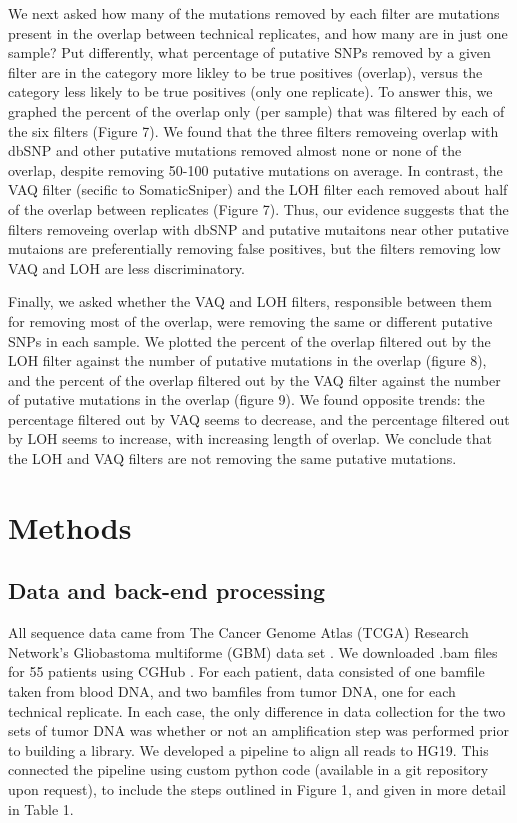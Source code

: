 \documentclass[11pt]{article} %
\begin{document}
We next asked how many of the mutations removed by each filter are mutations present in the overlap between technical replicates, and how many are in just one sample? Put differently, what percentage of putative SNPs removed by a given filter are in the category more likley to be true positives (overlap), versus the category less likely to be true positives (only one replicate). To answer this, we graphed the percent of the overlap only (per sample) that was filtered by each of the six filters (Figure 7). We found that the three filters removeing overlap with dbSNP and other putative mutations removed almost none or none of the overlap, despite removing 50-100 putative mutations on average. In contrast, the VAQ filter (secific to SomaticSniper) and the LOH filter each removed about half of the overlap between replicates (Figure 7). Thus, our evidence suggests that the filters removeing overlap with dbSNP and putative mutaitons near other putative mutaions are preferentially removing false positives, but the filters removing low VAQ and LOH are less discriminatory. 

Finally, we asked whether the VAQ and LOH filters, responsible between them for removing most of the overlap, were removing the same or different putative SNPs in each sample. We plotted the percent of the overlap filtered out by the LOH filter against the number of putative mutations in the overlap (figure 8), and the percent of the overlap filtered out by the VAQ filter against the number of putative mutations in the overlap (figure 9). We found opposite trends: the percentage filtered out by VAQ seems to decrease, and the percentage filtered out by LOH seems to increase, with increasing length of overlap. We conclude that the LOH and VAQ filters are not removing the same putative mutations. 

\section{Methods}

\subsection{Data and back-end processing}

All sequence data came from The Cancer Genome Atlas (TCGA) Research Network's Gliobastoma multiforme (GBM) data set \cite{TCGA-GBM}. We downloaded .bam files for 55 patients using CGHub \cite{CGHub}. For each patient, data consisted of one bamfile taken from blood DNA, and two bamfiles from tumor DNA, one for each technical replicate. In each case, the only difference in data collection for the two sets of tumor DNA was whether or not an amplification step was performed prior to building a library. We developed a pipeline to align all reads to HG19. This connected the pipeline using custom python code (available in a git repository upon request), to include the steps outlined in Figure 1, and given in more detail in Table 1. 
\end{document}
